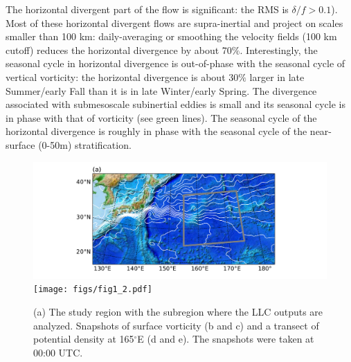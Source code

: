 \documentclass[grl]{agutex2015}
\begin{document}
\begin{article}
The horizontal divergent part of the flow is significant: the RMS is $\delta/f > 0.1$).
Most of these horizontal divergent flows are supra-inertial and project
on scales smaller than 100 km: daily-averaging or smoothing the velocity fields
 (100 km cutoff) reduces the horizontal divergence by about 70$\%$.
Interestingly, the seasonal cycle in horizontal divergence is out-of-phase with the
seasonal cycle of vertical vorticity: the horizontal divergence is about 30$\%$ larger in late
Summer/early Fall than it is in late Winter/early Spring. The divergence associated
with submesoscale subinertial eddies is small and its seasonal cycle is in phase
with that of vorticity (see green lines).  The seasonal cycle of the horizontal
divergence is roughly in phase with the seasonal cycle of the near-surface (0-50m)
stratification.
\begin{figure}[ht]
\begin{center}
\hspace{-1.25cm}\includegraphics[width=.7\textwidth]{figs/fig1_1.pdf}\\
\vspace{-.125cm}
\texttt{[image: figs/fig1\_2.pdf]}
 \caption{(a) The study region with the subregion where the LLC outputs are
          analyzed. Snapshots of surface vorticity (b and c) and a transect
          of potential density at 165$^\circ$E (d and e). The snapshots were
          taken at 00:00 UTC.}
\vspace{-1.5cm}
 \label{fig1}
 \end{center}
 \end{figure}


\end{article}
\end{document}
